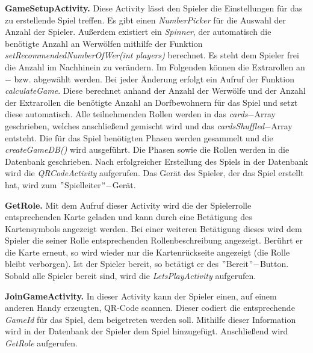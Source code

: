 \documentclass[12pt, a4paper]{article}
\begin{document}
\vspace{0,3 cm}
      
\textbf{GameSetupActivity.}
Diese Activity lässt den Spieler die Einstellungen für das zu erstellende Spiel treffen.
Es gibt einen \textit{NumberPicker} für die Auswahl der Anzahl der Spieler.
Außerdem existiert ein \textit{Spinner}, der automatisch die benötigte Anzahl an Werwölfen mithilfe der Funktion \textit{setRecommendedNumberOfWer(int players)} berechnet. Es steht dem Spieler frei die Anzahl im Nachhinein zu verändern.
Im Folgenden können die Extrarollen an$-$ bzw. abgewählt werden.
Bei jeder Änderung erfolgt ein Aufruf der Funktion \textit{calculateGame}. Diese berechnet anhand der Anzahl der Werwölfe und der Anzahl der Extrarollen die benötigte Anzahl an Dorfbewohnern für das Spiel und setzt diese automatisch.
Alle teilnehmenden Rollen werden in das \textit{cards}$-$Array geschrieben, welches anschließend gemischt wird
und das \textit{cardsShuffled}$-$Array entsteht.
Die für das Spiel benötigten Phasen werden gesammelt und die \textit{createGameDB()} wird ausgeführt.
Die Phasen sowie die Rollen werden in die Datenbank geschrieben.
Nach erfolgreicher Erstellung des Spiels in der Datenbank wird die \textit{QRCodeActivity} aufgerufen. Das Gerät des Spieler, der das Spiel erstellt hat, wird zum $"$Spielleiter$"-$Gerät.
\vspace{0,3 cm}  

\textbf{GetRole.}
Mit dem Aufruf dieser Activity wird die der Spielerrolle entsprechenden Karte geladen und kann durch eine Betätigung des Kartensymbols angezeigt werden. Bei einer weiteren Betätigung dieses wird dem Spieler die seiner Rolle entsprechenden Rollenbeschreibung angezeigt. Berührt er die Karte erneut, so wird wieder nur die Kartenrückseite angezeigt (die Rolle bleibt verborgen). Ist der Spieler bereit, so betätigt er des $"$Bereit$"-$Button. Sobald alle Spieler bereit sind, wird die \textit{LetsPlayActivity} aufgerufen.

\vspace{0,3 cm}      
      
\textbf{JoinGameActivity.}
In dieser Activity kann der Spieler einen, auf einem anderen Handy erzeugten, QR-Code scannen.
Dieser codiert die entsprechende \textit{GameId} für das Spiel, dem beigetreten werden soll.
Mithilfe dieser Information wird in der Datenbank der Spieler dem Spiel hinzugefügt.
Anschließend wird \textit{GetRole} aufgerufen.

\vspace{0,3 cm}
      
\end{document}
